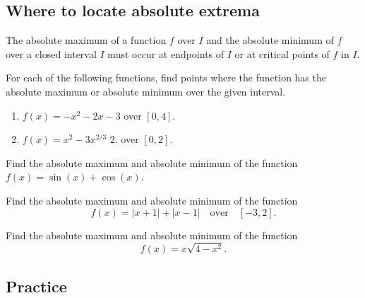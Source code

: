 \hypertarget{where-to-locate-absolute-extrema}{%
\subsection{Where to locate absolute
extrema}\label{where-to-locate-absolute-extrema}}

The absolute maximum of a function \(f\) over \(I\) and the absolute
minimum of \(f\) over a closed interval \(I\) must occur at endpoints of
\(I\) or at critical points of \(f\) in \(I\).

\begin{example}

For each of the following functions, find points where the function has
the absolute maximum or absolute minimum over the given interval.

\begin{enumerate}
\item
  \(f(x)= - x^2-2x - 3\) over \([0,4].\)
\item
  \(f(x)=x^2 - 3x^{2/3}\) 2. over \([0,2]\).
\end{enumerate}

\end{example}

\begin{example}

Find the absolute maximum and absolute minimum of the function
\(f(x)=\sin(x)+\cos(x)\).

\end{example}
\vspace*{6\baselineskip}

\begin{example}

Find the absolute maximum and absolute minimum of the function
\[f(x)=|x+1|+|x-1|\quad\text{over}\quad [-3,2].\]

\end{example}
\vspace*{6\baselineskip}

\begin{example}

Find the absolute maximum and absolute minimum of the function
\[f(x)=x\sqrt{4-x^2}.\]

\end{example}
\vspace*{6\baselineskip}

\subsection{Practice}

